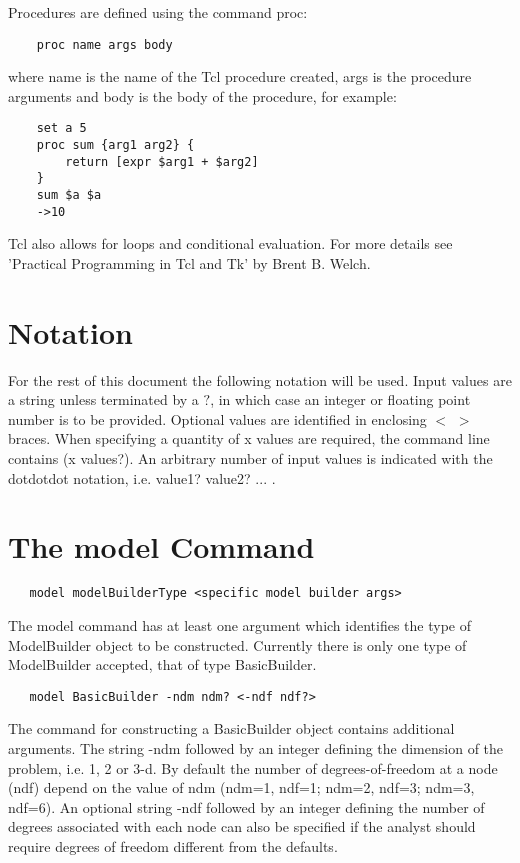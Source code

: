\documentclass[12pt]{article}
\begin{document}
Procedures are defined using the command proc:

{\sf\small
\begin{verbatim}
	proc name args body
\end{verbatim}
}

\noindent where name is the name of the Tcl procedure created, args is the
procedure arguments and body is the body of the procedure, for example:

{\sf\small
\begin{verbatim}
	set a 5
	proc sum {arg1 arg2} {
		return [expr $arg1 + $arg2]
	}
	sum $a $a
	->10
\end{verbatim}
}

Tcl also allows for loops and conditional evaluation. For more
details see 'Practical Programming in Tcl and Tk' by Brent B. Welch.

\section{Notation}
For the rest of this document the following notation will be
used. Input values are a string unless terminated by a $?$, in which
case an 
integer or floating point number is to be provided. Optional values
are identified in enclosing $<$ $>$ braces. When specifying a quantity
of x values are required, the command line contains (x values?). An
arbitrary number of input values is indicated with the dotdotdot
notation, i.e. value1? value2? ... .


\section{The model Command}
{\sf\small
\begin{verbatim}
   model modelBuilderType <specific model builder args>
\end{verbatim}
}

\noindent The model command has at least one argument which identifies
the type of ModelBuilder object to be constructed. Currently there is
only one type of ModelBuilder accepted, that of type BasicBuilder. 

{\sf\small
\begin{verbatim}
   model BasicBuilder -ndm ndm? <-ndf ndf?>
\end{verbatim}
}

\noindent The command for constructing a BasicBuilder object contains
additional arguments. The string -ndm followed by an integer
defining the dimension of the problem, i.e. 1, 2 or 3-d. By default the
number of degrees-of-freedom at a node (ndf) depend on the value of
ndm (ndm=1, ndf=1; ndm=2, ndf=3; ndm=3, ndf=6). An optional
string -ndf followed by an integer defining the number of degrees
associated with each node can also be specified if the analyst should
require degrees of freedom different from the defaults.
\end{document}
